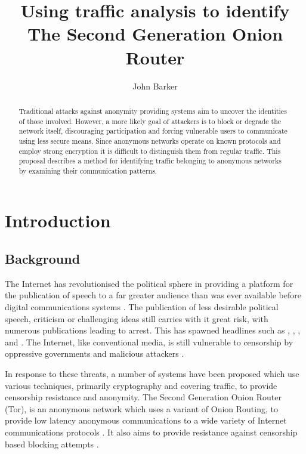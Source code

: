 \documentclass{ecuthesis}
\title{Using traffic analysis to identify The Second Generation Onion Router}
\author{John Barker}
\begin{document}
\maketitle

\tableofcontents
\listoftables
\listoffigures

\begin{abstract}
\thispagestyle{empty}

Traditional attacks against anonymity providing systems aim to uncover the
identities of those involved. However, a more likely goal of attackers is to
block or degrade the network itself, discouraging participation and forcing
vulnerable users to communicate using less secure means. Since anonymous
networks operate on known protocols and employ strong encryption it is
difficult to distinguish them from regular traffic. This proposal describes a
method for identifying traffic belonging to anonymous networks by examining
their communication patterns.

\end{abstract}

\chapter{Introduction}

\section{Background}

The Internet has revolutionised the political sphere in providing a platform
for the publication of speech to a far greater audience than was ever available
before digital communications systems \parencite{Bonchek:1997p3455}. The
publication of less desirable political speech, criticism or challenging ideas
still carries with it great risk, with numerous publications leading to arrest.
This has spawned headlines such as \textcite{website:egypt-arrests},
\parencite{website:china-yahoo-torture},
\parencite{website:vietnam-bloggers-arrested},
\textcite{website:iran-bloggers-arrested} and
 \parencite{website:blogger-arrests}. The
Internet, like conventional media, is still vulnerable to censorship by
oppressive governments and malicious attackers
\parencite{Crandall:2007p6165,Karlin:2009p6166}.

In response to these threats, a number of systems have been proposed which use
various techniques, primarily cryptography and covering traffic, to provide
censorship resistance and anonymity. The Second Generation Onion Router (Tor),
is an anonymous network which uses a variant of Onion Routing, to provide low
latency anonymous communications to a wide variety of Internet communications
protocols \parencite{Dingledine:2004p314}. It also aims to provide resistance
against censorship based blocking attempts \parencite{Dingledine:2008p1542}.
\end{document}
